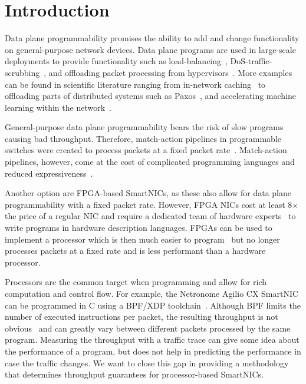 \documentclass[10pt,letterpaper,sigconf,anonymous,nonacm,screen]{acmart}
\begin{document}
\maketitle


\section{Introduction}

Data plane programmability promises the ability to add and change functionality on general-purpose network devices.
Data plane programs are used in large-scale deployments to provide functionality such as load-balancing~\cite{facebook-lb}, DoS-traffic-scrubbing~\cite{cloudflare}, and offloading packet processing from hypervisors~\cite{accelnet}.
More examples can be found in scientific literature ranging from in-network caching~\cite{netcache} to offloading parts of distributed systems such as Paxos~\cite{netpaxos}, and accelerating machine learning within the network~\cite{SwitchML,dumb-idea,ATP}.

General-purpose data plane programmability bears the risk of slow programs causing bad throughput.
Therefore, match-action pipelines in programmable switches were created to process packets at a fixed packet rate~\cite{RMT}.
Match-action pipelines, however, come at the cost of complicated programming languages and reduced expressiveness~\cite{p4-survey,p4-challenges}.

Another option are FPGA-based SmartNICs, as these also allow for data plane programmability with a fixed packet rate.
However, FPGA NICs cost at least 8$\times$ the price of a regular NIC and require a dedicated team of hardware experts~\cite{hXDP,accelnet} to write programs in hardware description languages.
FPGAs can be used to implement a processor which is then much easier to program~\cite{hXDP} but no longer processes packets at a fixed rate and is less performant than a hardware processor.

Processors are the common target when programming and allow for rich computation and control flow.
For example, the Netronome Agilio CX SmartNIC can be programmed in C using a BPF/XDP toolchain~\cite{XDP,XDP-offload}.
Although BPF limits the number of executed instructions per packet, the resulting throughput is not obvious~\cite{XDP} and can greatly vary between different packets processed by the same program.
Measuring the throughput with a traffic trace can give some idea about the performance of a program, but does not help in predicting the performance in case the traffic changes.
We want to close this gap in providing a methodology that determines throughput guarantees for processor-based SmartNICs.
\end{document}
